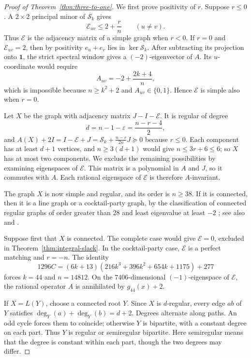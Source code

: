 \documentclass[a4paper,10pt,reqno]{amsart}
\theoremstyle{plain}
\theoremstyle{definition}
\theoremstyle{remark}
\newcommand{\one}{\mathbf 1}
\begin{document}
\begin{proof}[Proof of Theorem~\ref{thm:three-to-one}]
We first prove positivity of \(r\).  Suppose \(r\le0\).  A
\(2\times2\) principal minor of \(\mathcal S_k\) gives
\[
 \mathcal E_{uv}\le2+\frac rn\qquad(u\ne v).
\]
Thus \(\mathcal E\) is the adjacency matrix of a simple graph when \(r<0\).
If \(r=0\) and \(\mathcal E_{uv}=2\), then by positivity \(e_u+e_v\) lies in
\(\ker\mathcal S_k\).  After subtracting its projection onto \(\one\), the
strict spectral window gives a \((-2)\)-eigenvector of \(A\).  Its
\(u\)-coordinate would require
\[
 A_{uv}=-2+\frac{2k+4}{n},
\]
which is impossible because \(n\ge k^2+2\) and \(A_{uv}\in\{0,1\}\).
Hence \(\mathcal E\) is simple also when \(r=0\).

Let \(X\) be the graph with adjacency matrix \(J-I-\mathcal E\).
It is regular of degree
\[
 d=n-1-\varepsilon=\frac{n-r-4}{2},
\]
and \(A(X)+2I=I-\mathcal E+J=\mathcal S_k+\frac{n-r}{2n}J\succeq0\) because
\(r\le0\). Each component has at least \(d+1\) vertices, and \(n\ge3(d+1)\)
would give \(n\le3r+6\le6\); so \(X\) has at most two components.
We exclude the remaining possibilities by examining eigenspaces of
\(\mathcal E\). This matrix is a polynomial in \(A\) and \(J\), so it
commutes with \(A\). Each rational eigenspace of \(\mathcal E\) is therefore
\(A\)-invariant.

The graph \(X\) is now simple and regular, and its order is
\(n\ge38\).  If it is connected, then it is a line graph or a
cocktail-party graph, by the classification of connected regular graphs of
order greater than \(28\) and least eigenvalue at least \(-2\)
\cite{CameronEtAl1976}; see also
\cite[Theorems~4.1.1 and~4.1.5]{CvetkovicEtAl2004} and
\cite[Introduction]{KoolenEtAl2025}.

Suppose first that \(X\) is connected.  The complete case would give
\(\mathcal E=0\), excluded in Theorem~\ref{thm:integral-slack}.  In the
cocktail-party case, \(\mathcal E\) is a perfect matching and \(r=-n\).
The identity
\[
 1296C=(6k+13)(216k^3+396k^2+654k+1175)+277
\]
forces \(k=44\) and \(n=14812\).  On the \(7406\)-dimensional
 \((-1)\)-eigenspace of \(\mathcal E\), the rational operator \(A\) is
 annihilated by \(g_{44}(x)+2\).

If \(X=L(Y)\), choose a connected root \(Y\). Since \(X\) is
\(d\)-regular, every edge \(ab\) of \(Y\) satisfies
\(\deg_Y(a)+\deg_Y(b)=d+2\). Degrees alternate along paths. An odd
cycle forces them to coincide; otherwise \(Y\) is bipartite, with a
constant degree on each part. Thus \(Y\) is regular or semiregular
bipartite. Here semiregular means that the degree is constant within each
part, though the two degrees may differ.


\end{proof}
\end{document}
